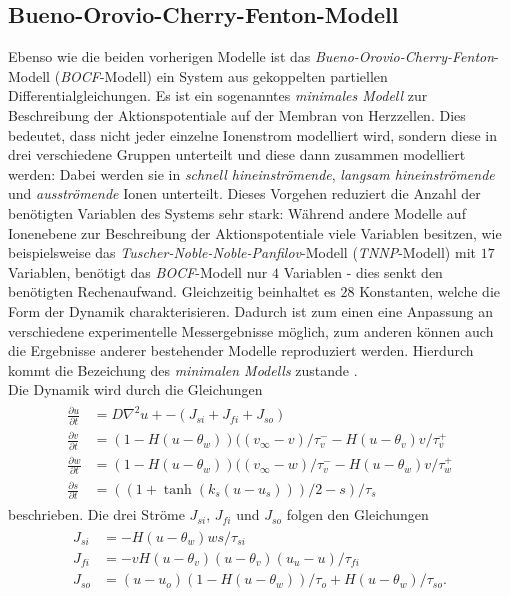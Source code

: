 \subsection{Bueno-Orovio-Cherry-Fenton-Modell}
Ebenso wie die beiden vorherigen Modelle ist das \textit{Bueno-Orovio-Cherry-Fenton}-Modell (\textit{BOCF}-Modell) ein System aus gekoppelten partiellen Differentialgleichungen. Es ist ein sogenanntes \textit{minimales Modell} zur Beschreibung der Aktionspotentiale auf der Membran von Herzzellen. Dies bedeutet, dass nicht jeder einzelne Ionenstrom modelliert wird, sondern diese in drei verschiedene Gruppen unterteilt und diese dann zusammen modelliert werden: Dabei werden sie in \textit{schnell hineinströmende}, \textit{langsam hineinströmende} und \textit{ausströmende} Ionen unterteilt. Dieses Vorgehen reduziert die Anzahl der benötigten Variablen des Systems sehr stark: Während andere Modelle auf Ionenebene zur Beschreibung der Aktionspotentiale viele Variablen besitzen, wie beispielsweise das \textit{Tuscher-Noble-Noble-Panfilov}-Modell (\textit{TNNP}-Modell) mit $17$ Variablen, benötigt das \textit{BOCF}-Modell nur $4$ Variablen - dies senkt den benötigten Rechenaufwand. Gleichzeitig beinhaltet es $28$ Konstanten, welche die Form der Dynamik charakterisieren. Dadurch ist zum einen eine Anpassung an verschiedene experimentelle Messergebnisse möglich, zum anderen können auch die Ergebnisse anderer bestehender Modelle reproduziert werden. Hierdurch kommt die Bezeichung des \textit{minimalen Modells} zustande \citep{Bueno-Orovio2008}.\\

Die Dynamik wird durch die Gleichungen 
\begin{align}
\begin{aligned}
\frac{\partial u}{\partial t} &= D \nabla^2 u + - (J_{si} + J_{fi} + J_{so})\\
\frac{\partial v}{\partial t} &= (1-H(u-\theta_w))((v_\infty - v)/\tau_v^- - H(u-\theta_v)v/\tau_v^+ \\
\frac{\partial w}{\partial t} &= (1-H(u-\theta_w))((v_\infty - w)/\tau_v^- - H(u-\theta_w)v/\tau_w^+ \\
\frac{\partial s}{\partial t} &= ((1 + \tanh(k_s(u-u_s)))/2 - s)/\tau_s
\end{aligned}
\end{align}
beschrieben. Die drei Ströme $J_{si}$, $J_{fi}$ und $J_{so}$ folgen den Gleichungen
\begin{align}
\begin{aligned}
J_{si} &= -H(u-\theta_w)ws/\tau_{si} \\
J_{fi} &= -vH(u-\theta_v)(u-\theta_v)(u_u - u)/\tau_{fi} \\
J_{so} &= (u-u_o)(1-H(u-\theta_w))/\tau_o + H(u-\theta_w)/\tau_{so}.
\end{aligned}
\end{align}

